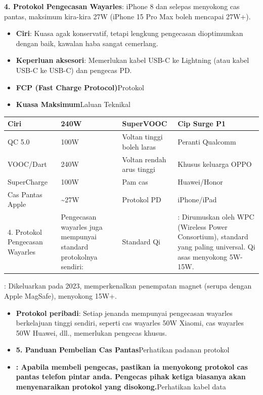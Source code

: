 \textbf{4. Protokol Pengecasan Wayarles}: iPhone 8 dan selepas menyokong cas pantas, maksimum kira-kira 27W (iPhone 15 Pro Max boleh mencapai 27W+).

\begin{itemize}
  \item \textbf{Ciri}: Kuasa agak konservatif, tetapi lengkung pengecasan dioptimumkan dengan baik, kawalan haba sangat cemerlang.
  \item \textbf{Keperluan aksesori}: Memerlukan kabel USB-C ke Lightning (atau kabel USB-C ke USB-C) dan pengecas PD.
  \item \textbf{FCP (Fast Charge Protocol)}Protokol
  \item \textbf{Kuasa Maksimum}Laluan Teknikal
\end{itemize}


\begin{center}
\begin{tabularx}{\linewidth}{|X|X|X|X|}
\hline
\textbf{Ciri} & \textbf{240W} & \textbf{SuperVOOC} & \textbf{Cip Surge P1} \tabularnewline
\hline
QC 5.0 & 100W & Voltan tinggi boleh laras & Peranti Qualcomm \tabularnewline
VOOC/Dart & 240W & Voltan rendah arus tinggi & Khusus keluarga OPPO \tabularnewline
SuperCharge & 100W & Pam cas & Huawei/Honor \tabularnewline
Cas Pantas Apple & \textasciitilde{}27W & Protokol PD & iPhone/iPad \tabularnewline
4. Protokol Pengecasan Wayarles & Pengecasan wayarles juga mempunyai standard protokolnya sendiri: & Standard Qi & : Dirumuskan oleh WPC (Wireless Power Consortium), standard yang paling universal. Qi asas menyokong 5W-15W. \tabularnewline
\hline
\end{tabularx}
\end{center}


: Dikeluarkan pada 2023, memperkenalkan penempatan magnet (serupa dengan Apple MagSafe), menyokong 15W+.

\begin{itemize}
  \item \textbf{Protokol peribadi}: Setiap jenanda mempunyai pengecasan wayarles berkelajuan tinggi sendiri, seperti cas wayarles 50W Xiaomi, cas wayarles 50W Huawei, dll., memerlukan pengecas khusus.
  \item \textbf{5. Panduan Pembelian Cas Pantas}Perhatikan padanan protokol
  \item \textbf{: Apabila membeli pengecas, pastikan ia menyokong protokol cas pantas telefon pintar anda. Pengecas pihak ketiga biasanya akan menyenaraikan protokol yang disokong.}Perhatikan kabel data
\end{itemize}

